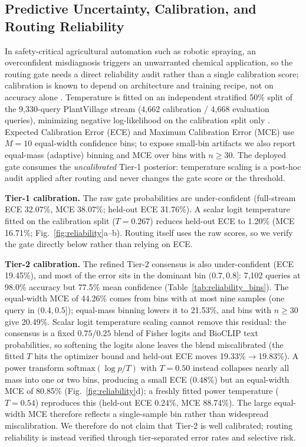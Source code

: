 \documentclass[preprint,12pt]{elsarticle}
\begin{document}
\subsection{Predictive Uncertainty, Calibration, and Routing Reliability}
\label{sec:calibration}
In safety-critical agricultural automation such as robotic spraying, an overconfident misdiagnosis triggers an unwarranted chemical application, so the routing gate needs a direct reliability audit rather than a single calibration score; calibration is known to depend on architecture and training recipe, not on accuracy alone \cite{minderer2021revisiting}. Temperature is fitted on an independent stratified 50\% split of the 9,330-query PlantVillage stream (4,662 calibration / 4,668 evaluation queries), minimizing negative log-likelihood on the calibration split only \cite{guo2017calibration}. Expected Calibration Error (ECE) and Maximum Calibration Error (MCE) use $M=10$ equal-width confidence bins; to expose small-bin artifacts we also report equal-mass (adaptive) binning and MCE over bins with $n \geq 30$. The deployed gate consumes the \emph{uncalibrated} Tier-1 posterior: temperature scaling is a post-hoc audit applied after routing and never changes the gate score or the threshold.

\textbf{Tier-1 calibration.} The raw gate probabilities are under-confident (full-stream ECE 32.07\%, MCE 38.07\%; held-out ECE 31.76\%). A scalar logit temperature fitted on the calibration split ($T=0.267$) reduces held-out ECE to 1.20\% (MCE 16.71\%; Fig.~\ref{fig:reliability}a--b). Routing itself uses the raw scores, so we verify the gate directly below rather than relying on ECE.

\textbf{Tier-2 calibration.} The refined Tier-2 consensus is also under-confident (ECE 19.45\%), and most of the error sits in the dominant bin $(0.7,0.8]$: 7,102 queries at 98.0\% accuracy but 77.5\% mean confidence (Table~\ref{tab:reliability_bins}). The equal-width MCE of 44.26\% comes from bins with at most nine samples (one query in $(0.4,0.5]$); equal-mass binning lowers it to 21.53\%, and bins with $n\geq30$ give 20.49\%. Scalar logit temperature scaling cannot remove this residual: the consensus is a fixed $0.75/0.25$ blend of Fisher logits and BioCLIP text probabilities, so softening the logits alone leaves the blend miscalibrated (the fitted $T$ hits the optimizer bound and held-out ECE moves 19.33\%$\to$19.83\%). A power transform $\mathrm{softmax}(\log p / T)$ with $T=0.50$ instead collapses nearly all mass into one or two bins, producing a small ECE (0.48\%) but an equal-width MCE of 80.85\% (Fig.~\ref{fig:reliability}d); a freshly fitted power temperature ($T=0.54$) reproduces this (held-out ECE 0.24\%, MCE 88.74\%). The large equal-width MCE therefore reflects a single-sample bin rather than widespread miscalibration. We therefore do not claim that Tier-2 is well calibrated; routing reliability is instead verified through tier-separated error rates and selective risk.
\end{document}
